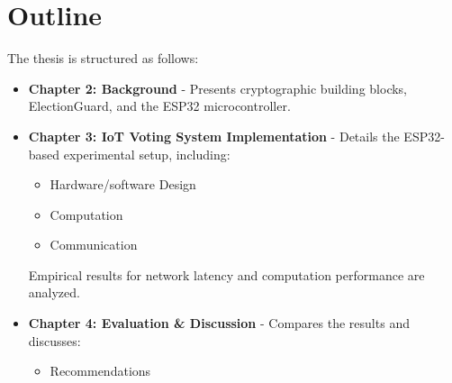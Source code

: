 \section{Outline}
The thesis is structured as follows:
\begin{itemize}
    \item \textbf{Chapter 2: Background} - Presents cryptographic building blocks, ElectionGuard, and the ESP32 microcontroller.
    
    \item \textbf{Chapter 3: IoT Voting System Implementation} - Details the ESP32-based experimental setup, including:
    \begin{itemize}
        \item Hardware/software Design
        \item Computation
        \item Communication
    \end{itemize}
    Empirical results for network latency and computation performance are analyzed.

    \item \textbf{Chapter 4: Evaluation \& Discussion} - Compares the results and discusses:
    \begin{itemize}
        \item Recommendations
    \end{itemize}
\end{itemize}


